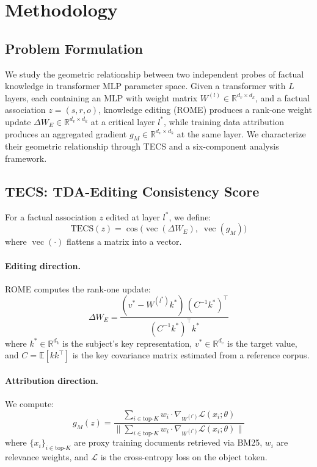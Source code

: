 \section{Methodology}
\label{sec:methodology}

\subsection{Problem Formulation}
\label{sec:problem}

We study the geometric relationship between two independent probes of factual knowledge in transformer MLP parameter space.
Given a transformer with $L$ layers, each containing an MLP with weight matrix $W^{(l)} \in \mathbb{R}^{d_v \times d_k}$, and a factual association $z = (s, r, o)$, knowledge editing (ROME) produces a rank-one weight update $\Delta W_E \in \mathbb{R}^{d_v \times d_k}$ at a critical layer $l^*$, while training data attribution produces an aggregated gradient $g_M \in \mathbb{R}^{d_v \times d_k}$ at the same layer.
We characterize their geometric relationship through TECS and a six-component analysis framework.

\subsection{TECS: TDA-Editing Consistency Score}
\label{sec:tecs}

For a factual association $z$ edited at layer $l^*$, we define:
\begin{equation}
\text{TECS}(z) = \cos\!\bigl(\operatorname{vec}(\Delta W_E),\; \operatorname{vec}(g_M)\bigr)
\label{eq:tecs}
\end{equation}
where $\operatorname{vec}(\cdot)$ flattens a matrix into a vector.

\paragraph{Editing direction.} ROME computes the rank-one update:
\begin{equation}
\Delta W_E = \frac{(v^* - W^{(l^*)} k^*) \, (C^{-1} k^*)^\top}{(C^{-1} k^*)^\top k^*}
\label{eq:rome}
\end{equation}
where $k^* \in \mathbb{R}^{d_k}$ is the subject's key representation, $v^* \in \mathbb{R}^{d_v}$ is the target value, and $C = \mathbb{E}[k k^\top]$ is the key covariance matrix estimated from a reference corpus.

\paragraph{Attribution direction.} We compute:
\begin{equation}
g_M(z) = \frac{\sum_{i \in \text{top-}K} w_i \cdot \nabla_{W^{(l^*)}} \mathcal{L}(x_i; \theta)}{\bigl\|\sum_{i \in \text{top-}K} w_i \cdot \nabla_{W^{(l^*)}} \mathcal{L}(x_i; \theta)\bigr\|}
\label{eq:attribution}
\end{equation}
where $\{x_i\}_{i \in \text{top-}K}$ are proxy training documents retrieved via BM25, $w_i$ are relevance weights, and $\mathcal{L}$ is the cross-entropy loss on the object token.

